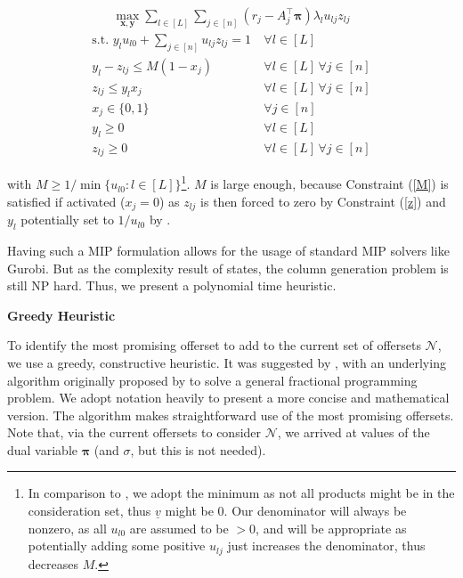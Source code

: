 {\setlength{\abovedisplayskip}{0pt}
	\setlength{\belowdisplayskip}{0pt}
\begin{align}
		\max_{\boldsymbol{x}, \boldsymbol{y}} \sum_{l \in [L]}\sum_{j \in [n]} (r_j - A_j^\intercal\boldsymbol{\pi}) \lambda_l u_{lj} z_{lj}
\end{align}%
\begin{align}
	\text{s.t. }y_l u_{l0} + \sum_{j \in [n]} u_{lj} z_{lj} = 1 &~\forall l \in [L]\\
	y_l - z_{lj} \leq M(1-x_j) &~\forall l\in [L]\,\forall j \in [n]\label{M}\\
	z_{lj} \leq y_l x_j &~\forall l\in [L]\,\forall j \in [n]\label{z}\\
	x_j \in \{0, 1\} &~\forall j \in [n]\\
	y_l \geq 0 &~\forall l \in [L]\\
	z_{lj} \geq 0 &~\forall l\in [L]\,\forall j \in [n]
\end{align}}

\noindent with $M \geq 1/\min\{u_{l0}: l\in [L]\}$\footnote{In comparison to \cite{Bront.2009}, we adopt the minimum as not all products might be in the consideration set, thus $\underline{v}$ might be $0$. Our denominator will always be nonzero, as all $u_{l0}$ are assumed to be $>0$, and will be appropriate as potentially adding some positive $u_{lj}$ just increases the denominator, thus decreases $M$.}. $M$ is large enough, because Constraint (\ref{M}) is satisfied if activated ($x_j = 0$) as $z_{lj}$ is then forced to zero by Constraint (\ref{z}) and $y_l$ potentially set to $1/u_{l0}$ by . 

Having such a MIP formulation allows for the usage of standard MIP solvers like Gurobi. But as the complexity result of \cite{Bront.2009} states, the column generation problem is still NP hard. Thus, we present a polynomial time heuristic.

\bigskip
\textbf{Greedy Heuristic}\label{greedyHeuristic}

To identify the most promising offerset to add to the current set of offersets $\mathcal{N}$, we use a greedy, constructive heuristic. It was suggested by \cite{Bront.2009}, with an underlying algorithm originally proposed by \cite{Prokopyev.2005b} to solve a general fractional programming problem. We adopt notation heavily to present a  more concise and mathematical version. The algorithm makes straightforward use of the most promising offersets. Note that, via the current offersets to consider $\mathcal{N}$, we arrived at values of the dual variable $\boldsymbol{\pi}$ (and $\sigma$, but this is not needed). 


